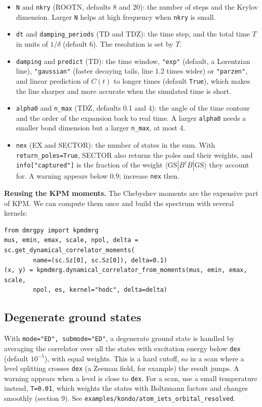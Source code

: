 \documentclass[11pt]{article}
\begin{document}
\begin{itemize}
  increase \texttt{cvm\_\allowbreak{}maxm}.
\item
  \texttt{N} and \texttt{nkry} (ROOTN, defaults 8 and 20): the number of steps and the
  Krylov dimension. Larger \texttt{N} helps at high frequency when \texttt{nkry} is
  small.
\item
  \texttt{dt} and \texttt{damping\_\allowbreak{}periods} (TD and TDZ): the time step, and the total
  time \(T\) in units of \(1/\delta\) (default 6). The resolution is set by
  \(T\).
\item
  \texttt{damping} and \texttt{predict} (TD): the time window, \texttt{"exp"} (default, a
  Lorentzian line), \texttt{"gaussian"} (faster decaying tails, line 1.2 times
  wider) or \texttt{"parzen"}, and linear prediction of \(C(t)\) to longer times
  (default \texttt{True}), which makes the line sharper and more accurate when
  the simulated time is short.
\item
  \texttt{alpha0} and \texttt{n\_\allowbreak{}max} (TDZ, defaults 0.1 and 4): the angle of the time
  contour and the order of the expansion back to real time. A larger
  \texttt{alpha0} needs a smaller bond dimension but a larger \texttt{n\_\allowbreak{}max}, at most 4.
\item
  \texttt{nex} (EX and SECTOR): the number of states in the sum. With
  \texttt{return\_\allowbreak{}poles=True}, SECTOR also returns the poles and their weights,
  and \texttt{info{[}"captured"{]}} is the fraction of the weight
  \(\langle\mathrm{GS}|B^\dagger B|\mathrm{GS}\rangle\) they account for. A
  warning appears below 0.9; increase \texttt{nex} then.
\end{itemize}

\textbf{Reusing the KPM moments.} The Chebyshev moments are the expensive part
of KPM. We can compute them once and build the spectrum with several
kernels:

\begin{lstlisting}
from dmrgpy import kpmdmrg
mus, emin, emax, scale, npol, delta = sc.get_dynamical_correlator_moments(
        name=(sc.Sz[0], sc.Sz[0]), delta=0.1)
(x, y) = kpmdmrg.dynamical_correlator_from_moments(mus, emin, emax, scale,
        npol, es, kernel="hodc", delta=delta)
\end{lstlisting}

\subsection{Degenerate ground states}

With \texttt{mode="ED",\ submode="ED"}, a degenerate ground state is handled by
averaging the correlator over all the states with excitation energy below
\texttt{dex} (default \(10^{-5}\)), with equal weights. This is a hard cutoff, so in
a scan where a level splitting crosses \texttt{dex} (a Zeeman field, for example)
the result jumps. A warning appears when a level is close to \texttt{dex}. For a
scan, use a small temperature instead, \texttt{T=0.\allowbreak{}01}, which weights the states
with Boltzmann factors and changes smoothly (section 9). See
\texttt{examples/kondo/atom\_\allowbreak{}iets\_\allowbreak{}orbital\_\allowbreak{}resolved}.
\end{document}
